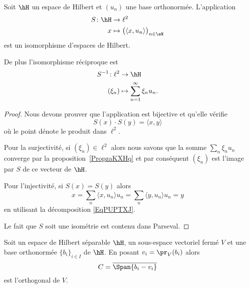 \begin{corollary}       \label{CorQETwUdF}
    Soit \( \hH\) un espace de Hilbert et \( (u_n)\) une base orthonormée. L'application
    \begin{equation}
        \begin{aligned}
            S\colon \hH&\to \ell^2 \\
            x&\mapsto \big( \langle x, u_n\rangle  \big)_{n\in \eN}
        \end{aligned}
    \end{equation}
    est un isomorphisme d'espaces de Hilbert.

    De plus l'isomorphisme réciproque est
    \begin{equation}
        \begin{aligned}
            S^{-1}\colon \ell^2&\to \hH \\
            (\xi_n)&\mapsto \sum_{n=1}^{\infty}\xi_nu_n.
        \end{aligned}
    \end{equation}
\end{corollary}

\begin{proof}
    Nous devons prouver que l'application est bijective et qu'elle vérifie
    \begin{equation}
        S(x)\cdot S(y)=\langle x, y\rangle
    \end{equation}
    où le point dénote le produit dans \( \ell^2\).

    Pour la surjectivité, si \( (\xi_n)\in \ell^2\) alors nous savons que la somme \( \sum_n\xi_nu_n\) converge par la proposition~\ref{PropzaKXHq} et par conséquent \( (\xi_n)\) est l'image par \( S\) de ce vecteur de \( \hH\).

    Pour l'injectivité, si \( S(x)=S(y)\) alors
    \begin{equation}
        x=\sum_n\langle x, u_n\rangle u_n=\sum_n\langle y, u_n\rangle u_n=y
    \end{equation}
    en utilisant la décomposition \eqref{EqPUPTXJ}.

    Le fait que \( S\) soit une isométrie est contenu dans Parseval.
\end{proof}

\begin{proposition}      \label{PROPooPVQIooPcEFSe}
    Soit un espace de Hilbert séparable \( \hH\), un sous-espace vectoriel fermé \( V\) et une base orthonormée \( \{ b_i \}_{i\in I}\) de \( \hH\). En posant \( v_i=\pr_V(b_i)\) alors
    \begin{equation}
        C=\overline{ \Span\{ b_i-v_i \} }
    \end{equation}
    est l'orthogonal de \( V\).
\end{proposition}

